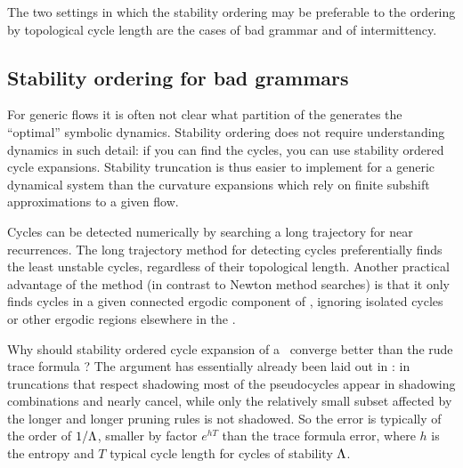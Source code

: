 The two settings in which the stability ordering may be preferable to
the ordering by topological cycle length are the cases of bad grammar
and of intermittency.

\subsection{Stability ordering for bad grammars}

For generic flows it is often not clear what
partition of the {\statesp} generates the ``optimal''
symbolic dynamics.  Stability ordering
does not require understanding dynamics in such detail:
if you can find the cycles, you can use
stability ordered cycle expansions.
Stability truncation
is thus
easier to implement for
a generic dynamical system than the
curvature expansions
which rely on finite subshift approximations
to a given flow.

Cycles can be detected numerically by
searching a long trajectory for near recurrences.
The long trajectory method for detecting cycles
preferentially finds
the least unstable cycles, regardless of their topological length.
Another practical advantage of the method (in contrast to
Newton method searches)
is that it only finds
cycles in a given connected ergodic component of {\statesp},
ignoring  isolated cycles or other ergodic regions
elsewhere in the {\statesp}.

Why should stability ordered cycle expansion of a \dzeta\ converge
better than the rude trace formula
?
The argument has essentially already been laid out in
:
in truncations that respect shadowing most of
the pseudocycles appear in shadowing combinations and nearly cancel,
while only the relatively small subset affected by the longer and
longer pruning rules is not shadowed. So the error is typically
of the order of $1/\Lambda$, smaller by factor $e^{hT}$ than the
trace formula
error, where $h$ is the entropy and
$T$ typical cycle length for cycles of stability  $\Lambda$.

